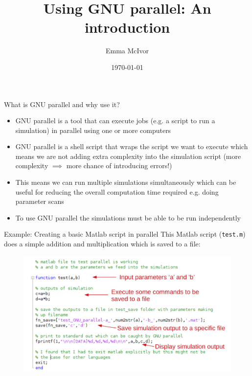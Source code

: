 \documentclass{beamer}
\title[Modelling \ca dynamics]{Using GNU parallel: An introduction}
\author[Emma McIvor]{Emma McIvor}
\institute{University of Nottingham}
\date{\today}
\begin{document}
\begin{frame}
  \titlepage
\end{frame}


\begin{frame}{What is GNU parallel and why use it?}
\begin{itemize}
	\item GNU parallel is a tool that can execute jobs (e.g. a script to run a simulation) in parallel using one or more computers
	\item GNU parallel is a shell script that wraps the script we want to execute which means we are not adding extra complexity into the simulation script (more complexity $\implies$ more chance of introducing errors!)
	\item This means we can run multiple simulations simultaneously which can be useful for reducing the overall computation time required e.g. doing parameter scans
	\item To use GNU parallel the simulations must be able to be run independently
\end{itemize}
\end{frame}

\begin{frame}{Example: Creating a basic Matlab script in parallel}
This Matlab script (\texttt{test.m}) does a simple addition and multiplication which is saved to a file:
\begin{figure}
\includegraphics[width=.8\linewidth]{figures/matlab_code_annotated.pdf}	
\end{figure}

\end{frame}
\end{document}
